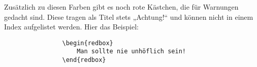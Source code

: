 				Zusätzlich zu diesen Farben gibt es noch rote Kästchen, die für Warnungen gedacht sind. Diese tragen als Titel stets „Achtung!“ und können nicht in einem Index aufgelistet werden. Hier das Beispiel: 
				
				\begin{verbatim}
				\begin{redbox}
					Man sollte nie unhöflich sein!
				\end{redbox}
				\end{verbatim}
				
				\newline


















